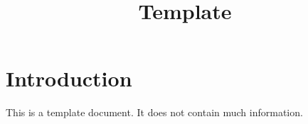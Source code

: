 \def\snippetdirectory{../} %



\title{Template}





\section{Introduction}

This is a template document. It does not contain much information. 


